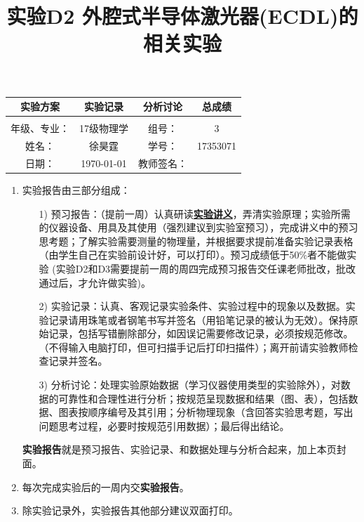 \documentclass[10pt,a4paper]{ctexart}
\title{实验D2 外腔式半导体激光器(ECDL)的相关实验}
\date{}
\begin{document}
\maketitle
\begin{center}
\begin{tabular}{|c|c|c|c|}
\hline
		实验方案 &实验记录  &分析讨论 &总成绩\\
		\hline
		        &          &          &  \\
	    \hline
	\hline 
	年级、专业： &17级物理学 &组号：& 3 \\
	\hline
	姓名：& 徐昊霆 &学号：&17353071  \\
	\hline
	日期：& \today &教师签名： &  \\
    \hline	
\end{tabular}
\end{center}
    \begin{enumerate}
 \item 实验报告由三部分组成：
 \begin{enumerate}
  \item[1)]预习报告：（提前一周）认真研读\textbf{\uline{实验讲义}}，弄清实验原理；实验所需的仪器设备、用具及其使用（强烈建议到实验室预习），完成讲义中的预习思考题；了解实验需要测量的物理量，并根据要求提前准备实验记录表格（由学生自己在实验前设计好，可以打印）。预习成绩低于50\%者不能做实验{\color{red} (实验D2和D3需要提前一周的周四完成预习报告交任课老师批改，批改通过后，才允许做实验)}。

  \item[2)]实验记录：认真、客观记录实验条件、实验过程中的现象以及数据。实验记录请用珠笔或者钢笔书写并签名（{\color{red}用铅笔记录的被认为无效}）。{\color{red}保持原始记录，包括写错删除部分，如因误记需要修改记录，必须按规范修改。}（不得输入电脑打印，但可扫描手记后打印扫描件）；离开前请实验教师检查记录并签名。
  \item[3)]分析讨论：处理实验原始数据（学习仪器使用类型的实验除外），对数据的可靠性和合理性进行分析；按规范呈现数据和结果（图、表），包括数据、图表按顺序编号及其引用；分析物理现象（含回答实验思考题，写出问题思考过程，必要时按规范引用数据）；最后得出结论。
 \end{enumerate}
 \textbf{实验报告}就是预习报告、实验记录、和数据处理与分析合起来，加上本页封面。
 \item 每次完成实验后的一周内交\textbf{实验报告}。
 \item 除实验记录外，实验报告其他部分建议双面打印。
\end{enumerate}

    
\newpage
\tableofcontents
\newpage
\end{document}
